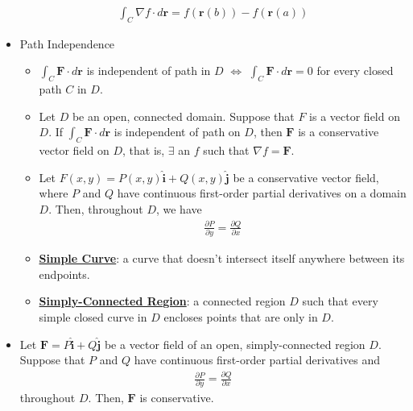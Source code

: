 \documentclass[reqno,11pt]{amsart}
\theoremstyle{definition}
\theoremstyle{remark}
\newcommand{\dfn}[1]{\underline{\textbf{#1}}}
\begin{document}
\begin{itemize}[noitemsep]
	\begin{align}
		\int_C \nabla f \cdot d \mathbf{r}  = f (\mathbf{r}(b)) - f (\mathbf{r}(a)) 	
	\end{align}
	\item Path Independence
	\begin{itemize}[noitemsep]
		\item $\int_C \mathbf{F} \cdot d \mathbf{r}$ is independent of path in $D$ $\iff$ $\int_C \mathbf{F} \cdot d \mathbf{r} = 0$ for every closed path $C$ in $D$.
		\item Let $D$ be an open, connected domain. Suppose that $F$ is a vector field on $D$. If $\int_C \mathbf{F} \cdot d \mathbf{r}$ is independent of path on $D$, then $\mathbf{F}$ is a conservative vector field on $D$, that is, $\exists$ an $f$ such that $\nabla f = \mathbf{F}$.
		\item Let $F(x,y) = P(x,y) \hat{\mathbf{i}} + Q(x,y) \hat{\mathbf{j}} $ be a conservative vector field, where $P $ and $Q$ have continuous first-order partial derivatives on a domain $D$. Then, throughout $D$, we have
		\begin{align}
			\frac{\partial P}{\partial y} = \frac{\partial Q}{\partial x}	
		\end{align}
		\item \dfn{Simple Curve}: a curve that doesn't intersect itself anywhere between its endpoints. 
		\item \dfn{Simply-Connected Region}: a connected region $D$ such that every simple closed curve in $D$ encloses points that are only in $D$.
	\end{itemize}
	\item Let $\mathbf{F} = P \hat{\mathbf{i}} + Q \mathbf{\hat{j}}$ be a vector field of an open, simply-connected region $D$. Suppose that $P$ and $Q$ have continuous first-order partial derivatives and 
	\begin{align}
		\frac{\partial P}{\partial y} = \frac{\partial Q}{\partial x}	
	\end{align}
	throughout $D$. Then, $\mathbf{F}$ is conservative. 
\end{itemize}
\end{document}
